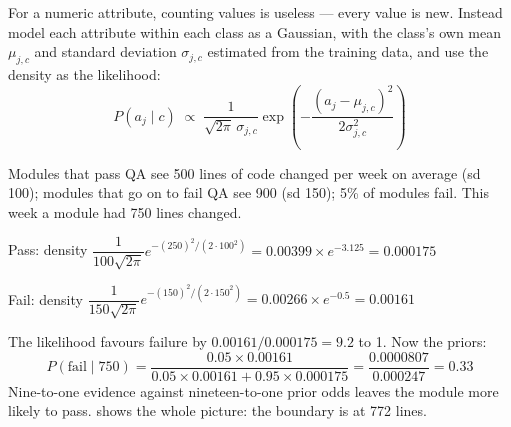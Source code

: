 For a numeric attribute, counting values is useless --- every value is new. Instead
model each attribute within each class as a Gaussian, with the class's own mean
$\mu_{j,c}$ and standard deviation $\sigma_{j,c}$ estimated from the training data,
and use the density as the likelihood:
\[
P(a_j \mid c) \;\propto\; \frac{1}{\sqrt{2\pi}\,\sigma_{j,c}}
\exp\!\left(-\frac{(a_j - \mu_{j,c})^2}{2\sigma_{j,c}^2}\right)
\]

\begin{worked}
Modules that pass QA see 500 lines of code changed per week on average (sd 100);
modules that go on to fail QA see 900 (sd 150); 5\% of modules fail. This week a
module had 750 lines changed.
\begin{tight}
  \item Pass: density $\dfrac{1}{100\sqrt{2\pi}}e^{-(250)^2/(2 \cdot 100^2)}
        = 0.00399 \times e^{-3.125} = 0.000175$
  \item Fail: density $\dfrac{1}{150\sqrt{2\pi}}e^{-(150)^2/(2 \cdot 150^2)}
        = 0.00266 \times e^{-0.5} = 0.00161$
\end{tight}
The likelihood favours failure by $0.00161/0.000175 = 9.2$ to 1. Now the priors:
\[
P(\text{fail} \mid 750) = \frac{0.05 \times 0.00161}{0.05 \times 0.00161 + 0.95 \times 0.000175}
= \frac{0.0000807}{0.000247} = \mathbf{0.33}
\]
Nine-to-one evidence against nineteen-to-one prior odds leaves the module more
likely to pass.  shows the whole picture: the boundary is at
772 lines.
\end{worked}

